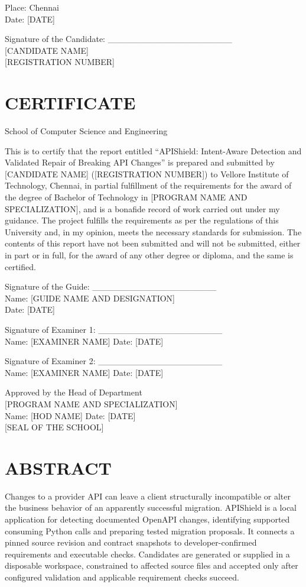 \documentclass[12pt,a4paper,oneside]{report}
\newcommand{\frontchapter}[1]{\chapter*{#1}\addcontentsline{toc}{chapter}{#1}}
\newcommand{\preliminarychapter}[1]{\chapter*{#1}\thispagestyle{empty}}
\begin{document}
Place: Chennai\\
Date: [DATE]\par

Signature of the Candidate: \_\_\_\_\_\_\_\_\_\_\_\_\_\_\_\_\_\_\_\_\\{}
[CANDIDATE NAME]\\{}
[REGISTRATION NUMBER]\par

\preliminarychapter{CERTIFICATE}
School of Computer Science and Engineering\par

This is to certify that the report entitled “APIShield: Intent-Aware Detection and Validated Repair of Breaking API Changes” is prepared and submitted by [CANDIDATE NAME] ([REGISTRATION NUMBER]) to Vellore Institute of Technology, Chennai, in partial fulfillment of the requirements for the award of the degree of Bachelor of Technology in [PROGRAM NAME AND SPECIALIZATION], and is a bonafide record of work carried out under my guidance. The project fulfills the requirements as per the regulations of this University and, in my opinion, meets the necessary standards for submission. The contents of this report have not been submitted and will not be submitted, either in part or in full, for the award of any other degree or diploma, and the same is certified.\par

Signature of the Guide: \_\_\_\_\_\_\_\_\_\_\_\_\_\_\_\_\_\_\_\_\\
Name: [GUIDE NAME AND DESIGNATION]\\
Date: [DATE]\par

Signature of Examiner 1: \_\_\_\_\_\_\_\_\_\_\_\_\_\_\_\_\_\_\_\_\\
Name: [EXAMINER NAME]    Date: [DATE]\par\vspace{4pt}
Signature of Examiner 2: \_\_\_\_\_\_\_\_\_\_\_\_\_\_\_\_\_\_\_\_\\
Name: [EXAMINER NAME]    Date: [DATE]\par

Approved by the Head of Department\\{}
[PROGRAM NAME AND SPECIALIZATION]\\
Name: [HOD NAME]    Date: [DATE]\\{}
[SEAL OF THE SCHOOL]\par

\clearpage
{}
\pagestyle{fancy}
\hypersetup{pageanchor=true}
\frontchapter{ABSTRACT}
Changes to a provider API can leave a client structurally incompatible or alter the business behavior of an apparently successful migration. APIShield is a local application for detecting documented OpenAPI changes, identifying supported consuming Python calls and preparing tested migration proposals. It connects a pinned source revision and contract snapshots to developer-confirmed requirements and executable checks. Candidates are generated or supplied in a disposable workspace, constrained to affected source files and accepted only after configured validation and applicable requirement checks succeed.\par
\end{document}
